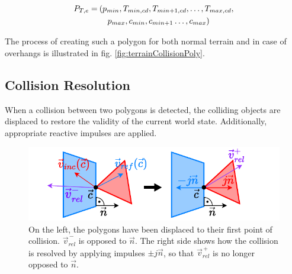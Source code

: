 \begin{align}
 P_{T,e} = \:& (p_{min}, T_{min, cd}, T_{min + 1, cd}, \dots, T_{max, cd},\notag\\
 & \quad p_{max}, c_{min}, c_{min + 1} \dots, c_{max})
\end{align}

The process of creating such a polygon for both normal terrain and in case of overhangs is illustrated in fig. \ref{fig:terrainCollisionPoly}.

\vspace{-3\abovedisplayskip}

\subsection{Collision Resolution}\label{sec:cr}

When a collision between two polygons is detected, the colliding objects are displaced to restore the validity of the current world state.
Additionally, appropriate reactive impulses are applied.

\begin{figure}[h!]
  \centering
  \includegraphics[width = .8\linewidth]{figures/physics/resolution.pdf}
  \caption{On the left, the polygons have been displaced to their first point of collision. $\vec{v}_{rel}^{\,-}$ is opposed to $\vec{n}$. The right side shows how the collision is resolved by applying impulses $\pm j\vec{n}$, so that $\vec{v}_{rel}^{\,+}$ is no longer opposed to $\vec{n}$.}
  \label{fig:CR}
\end{figure}

\vspace{-\abovedisplayskip}

